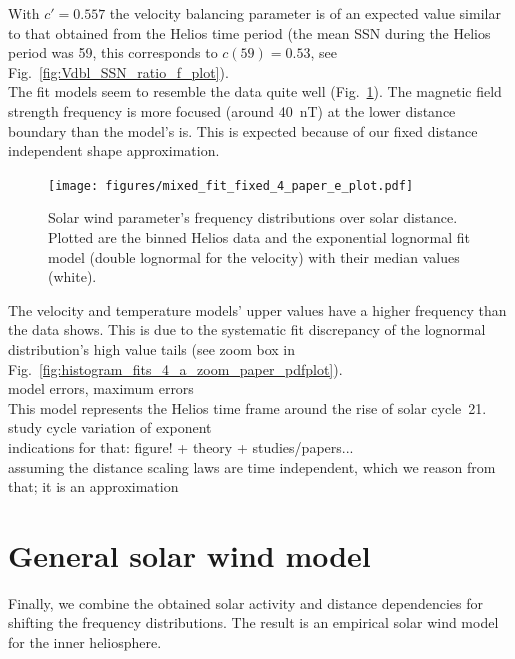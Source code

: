 With $c' = 0.557$ the velocity balancing parameter is of an expected value similar to that obtained from the Helios time period (the mean SSN during the Helios period was 59, this corresponds to $c(59) = 0.53$, see Fig.~\ref{fig:Vdbl_SSN_ratio_f_plot}).\\

The fit models seem to resemble the data quite well (Fig.~\ref{fig:mixed_fit_fixed_4_paper_e_plot}). The magnetic field strength frequency is more focused (around \SI{40}{nT}) at the lower distance boundary than the model's is. This is expected because of our fixed distance independent shape approximation.\\
\begin{figure}
	\texttt{[image: figures/mixed\_fit\_fixed\_4\_paper\_e\_plot.pdf]}
	\caption{Solar wind parameter's frequency distributions over solar distance. Plotted are the binned Helios data and the exponential lognormal fit model (double lognormal for the velocity) with their median values (white).}
	\label{fig:mixed_fit_fixed_4_paper_e_plot}
\end{figure}

The velocity and temperature models' upper values have a higher frequency than the data shows. This is due to the systematic fit discrepancy of the lognormal distribution's high value tails (see zoom box in Fig.~\ref{fig:histogram_fits_4_a_zoom_paper_pdfplot}).\\

model errors, maximum errors\\

This model represents the Helios time frame around the rise of solar cycle~21.\\

study cycle variation of exponent\\
indications for that: figure! + theory + studies/papers...\\
assuming the distance scaling laws are time independent, which we reason from that; it is an approximation\\


\section{General solar wind model}
\label{sec:general_solar_wind_model}

Finally, we combine the obtained solar activity and distance dependencies for shifting the frequency distributions. The result is an empirical solar wind model for the inner heliosphere.\\

